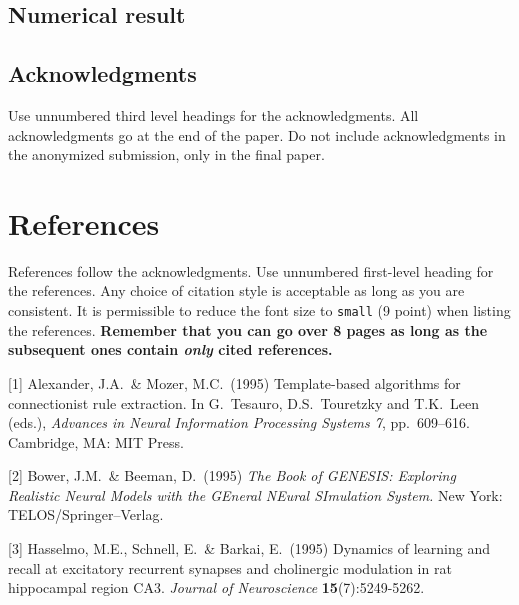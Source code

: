\documentclass{article}
\begin{document}
\subsection{Numerical result}
\subsection*{Acknowledgments}

Use unnumbered third level headings for the acknowledgments. All
acknowledgments go at the end of the paper. Do not include
acknowledgments in the anonymized submission, only in the final paper.

\section*{References}

References follow the acknowledgments. Use unnumbered first-level
heading for the references. Any choice of citation style is acceptable
as long as you are consistent. It is permissible to reduce the font
size to \verb+small+ (9 point) when listing the references. {\bf
  Remember that you can go over 8 pages as long as the subsequent ones contain
  \emph{only} cited references.}
\medskip

\small

[1] Alexander, J.A.\ \& Mozer, M.C.\ (1995) Template-based algorithms
for connectionist rule extraction. In G.\ Tesauro, D.S.\ Touretzky and
T.K.\ Leen (eds.), {\it Advances in Neural Information Processing
  Systems 7}, pp.\ 609--616. Cambridge, MA: MIT Press.

[2] Bower, J.M.\ \& Beeman, D.\ (1995) {\it The Book of GENESIS:
  Exploring Realistic Neural Models with the GEneral NEural SImulation
  System.}  New York: TELOS/Springer--Verlag.

[3] Hasselmo, M.E., Schnell, E.\ \& Barkai, E.\ (1995) Dynamics of
learning and recall at excitatory recurrent synapses and cholinergic
modulation in rat hippocampal region CA3. {\it Journal of
  Neuroscience} {\bf 15}(7):5249-5262.
\end{document}
